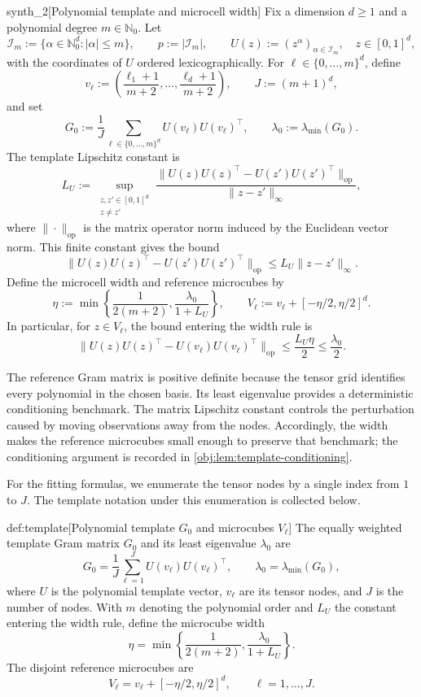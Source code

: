 \begin{definitionv}{synth_2}[Polynomial template and microcell width]
Fix a dimension \(d\ge1\) and a polynomial degree \(m\in\mathbb N_0\). Let
\[
\mathcal I_m:=\{\alpha\in\mathbb N_0^d:|\alpha|\le m\},
\qquad p:=|\mathcal I_m|,
\qquad U(z):=(z^\alpha)_{\alpha\in\mathcal I_m},
\quad z\in[0,1]^d,
\]
with the coordinates of \(U\) ordered lexicographically. For
\(\ell\in\{0,\ldots,m\}^d\), define
\[
v_\ell:=\left(\frac{\ell_1+1}{m+2},\ldots,
\frac{\ell_d+1}{m+2}\right),
\qquad J:=(m+1)^d,
\]
and set
\[
G_0:=\frac1J\sum_{\ell\in\{0,\ldots,m\}^d}
U(v_\ell)U(v_\ell)^\top,
\qquad \lambda_0:=\lambda_{\min}(G_0).
\]
The template Lipschitz constant is
\[
L_U:=
\sup_{\substack{z,z'\in[0,1]^d\\z\ne z'}}
\frac{\|U(z)U(z)^\top-U(z')U(z')^\top\|_{\mathrm{op}}}
{\|z-z'\|_\infty},
\]
where \(\|\cdot\|_{\mathrm{op}}\) is the matrix operator norm induced by the Euclidean vector norm. This finite constant gives the bound
\[
\|U(z)U(z)^\top-U(z')U(z')^\top\|_{\mathrm{op}}
\le L_U\|z-z'\|_\infty.
\]
Define the microcell width and reference microcubes by
\[
\eta:=\min\left\{\frac1{2(m+2)},\frac{\lambda_0}{1+L_U}\right\},
\qquad
V_\ell:=v_\ell+[-\eta/2,\eta/2]^d.
\]
In particular, for \(z\in V_\ell\), the bound entering the width rule is
\[
\|U(z)U(z)^\top-U(v_\ell)U(v_\ell)^\top\|_{\mathrm{op}}
\le \frac{L_U\eta}{2}\le\frac{\lambda_0}{2}.
\]
\end{definitionv}

The reference Gram matrix  is positive definite because the tensor grid identifies every polynomial in the chosen basis. Its least eigenvalue  provides a deterministic conditioning benchmark. The matrix Lipschitz constant  controls the perturbation caused by moving observations away from the nodes. Accordingly, the width  makes the reference microcubes  small enough to preserve that benchmark; the conditioning argument is recorded in \cref{obj:lem:template-conditioning}.

For the fitting formulas, we enumerate the tensor nodes by a single index from \(1\) to \(J\). The template notation under this enumeration is collected below.

\begin{definitionv}{def:template}[Polynomial template $G_0$ and microcubes $V_\ell$]
The equally weighted template Gram matrix \(G_0\) and its least eigenvalue \(\lambda_0\) are
\[
G_0=\frac{1}{J}\sum_{\ell=1}^{J}U(v_\ell)U(v_\ell)^\top,
\qquad
\lambda_0=\lambda_{\min}(G_0),
\]
where \(U\) is the polynomial template vector, \(v_\ell\) are its tensor nodes, and \(J\) is the number of nodes. With \(m\) denoting the polynomial order and \(L_U\) the constant entering the width rule, define the microcube width
\[
\eta=\min\left\{\frac{1}{2(m+2)},\frac{\lambda_0}{1+L_U}\right\}.
\]
The disjoint reference microcubes are
\[
V_\ell=v_\ell+[-\eta/2,\eta/2]^d,
\qquad \ell=1,\ldots,J.
\]
\end{definitionv}

